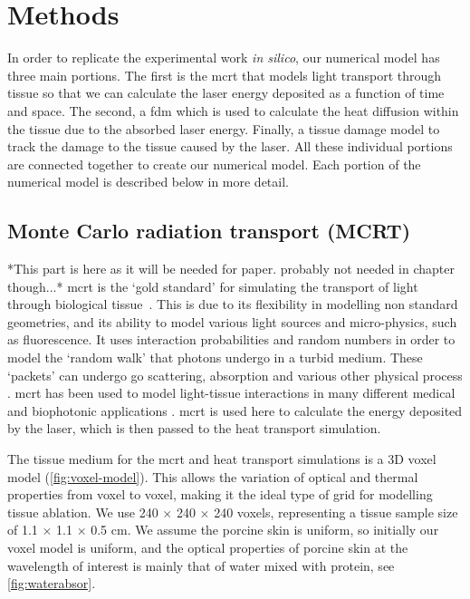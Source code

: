 \section{Methods}

In order to replicate the experimental work \textit{in silico}, our numerical model has three main portions. The first is the \gls{mcrt} that models light transport through tissue so that we can calculate the laser energy deposited as a function of time and space. The second, a \gls{fdm} which is used to calculate the heat diffusion within the tissue due to the absorbed laser energy. Finally, a tissue damage model to track the damage to the tissue caused by the laser. All these individual portions are connected together to create our numerical model. Each portion of the numerical model is described below in more detail.

\subsection{Monte Carlo radiation transport (MCRT)}%

*This part is here as it will be needed for paper. probably not needed in chapter though...*
\gls{mcrt} is the `gold standard' for simulating the transport of light through biological tissue~\cite{kong2008efficient}. This is due to its flexibility in modelling non standard geometries, and its ability to model various light sources and micro-physics, such as fluorescence. It uses interaction probabilities and random numbers in order to model the `random walk' that photons undergo in a turbid medium. These `packets' can undergo go scattering, absorption and various other physical process \cite{yao1999monte,welch1997propagation}. \gls{mcrt} has been used to model light-tissue interactions in many different medical and biophotonic applications \cite{campbell2015monte,boas2002three,patwardhan2005monte}. \gls{mcrt} is used here to calculate the energy deposited by the laser, which is then passed to the heat transport simulation.

The tissue medium for the \gls{mcrt} and heat transport simulations is a 3D voxel model (\cref{fig:voxel-model}). This allows the variation of optical and thermal properties from voxel to voxel, making it the ideal type of grid for modelling tissue ablation. We use  240 $\times$ 240 $\times$ 240 voxels, representing a tissue sample size of 1.1 $\times$ 1.1 $\times$ 0.5 cm. We assume the porcine skin is uniform, so initially our voxel model is uniform, and the optical properties of porcine skin at the wavelength of interest is mainly that of water mixed with protein, see \cref{fig:waterabsor}.



